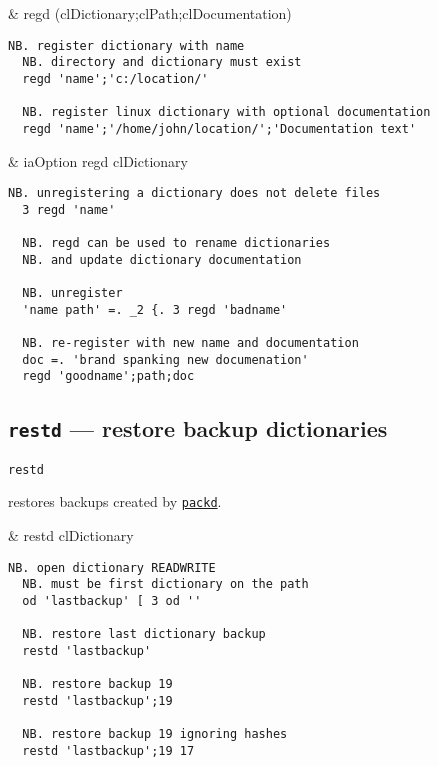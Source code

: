 \begin{wordhead}
\monad & regd (clDictionary;clPath;clDocumentation) \\
\end{wordhead}
\begin{lstlisting}[frame=single,framerule=0pt] 
  NB. register dictionary with name 
  NB. directory and dictionary must exist
  regd 'name';'c:/location/' 

  NB. register linux dictionary with optional documentation
  regd 'name';'/home/john/location/';'Documentation text' 
\end{lstlisting} 

\begin{wordhead}
\dyad & iaOption regd clDictionary \\
\end{wordhead}
\begin{lstlisting}[frame=single,framerule=0pt] 
  NB. unregistering a dictionary does not delete files 
  3 regd 'name' 

  NB. regd can be used to rename dictionaries 
  NB. and update dictionary documentation
  
  NB. unregister
  'name path' =. _2 {. 3 regd 'badname'  
  
  NB. re-register with new name and documentation 
  doc =. 'brand spanking new documenation' 
  regd 'goodname';path;doc 
\end{lstlisting}                  


\subsection{\texttt{restd} --- restore backup dictionaries}\label{ss:restd} 

\hypertarget{il:restd}{\texttt{restd}}  restores  backups created by
 \hyperlink{il:packd}{\texttt{packd}}. 

\begin{wordhead}
\monad & restd clDictionary \\
\end{wordhead}
\begin{lstlisting}[frame=single,framerule=0pt] 
  NB. open dictionary READWRITE 
  NB. must be first dictionary on the path
  od 'lastbackup' [ 3 od '' 

  NB. restore last dictionary backup
  restd 'lastbackup' 

  NB. restore backup 19 
  restd 'lastbackup';19

  NB. restore backup 19 ignoring hashes
  restd 'lastbackup';19 17
\end{lstlisting}                   


